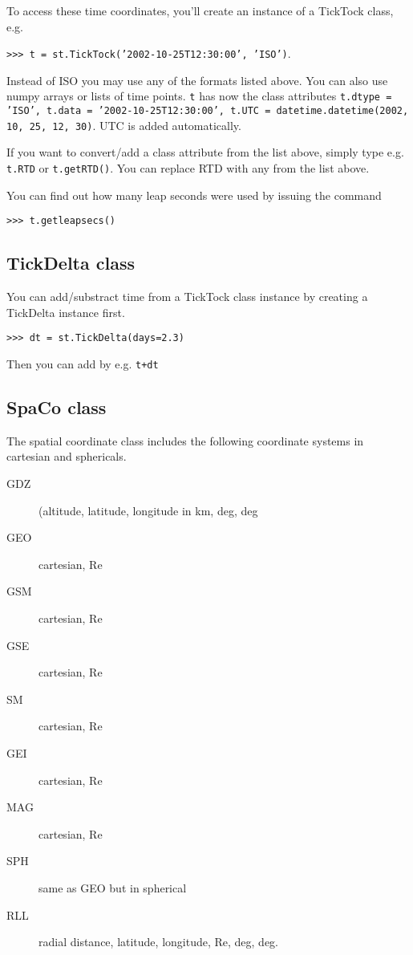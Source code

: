 \documentclass[11pt]{amsart}
\begin{document}
To access these time coordinates, you'll create an instance of a TickTock class, e.g. 

\texttt{>>> t = st.TickTock('2002-10-25T12:30:00', 'ISO')}. 

Instead of ISO you may use any of the formats listed above. You can also use numpy arrays or lists of time points. \texttt{t} has now the class attributes \texttt{t.dtype = 'ISO', t.data = '2002-10-25T12:30:00', t.UTC = datetime.datetime(2002, 10, 25, 12, 30)}. UTC is added automatically.

If you want to convert/add a class attribute from the list above, simply type e.g.
\texttt{t.RTD} or \texttt{t.getRTD()}. You can replace RTD with any from the list above.

You can find out how many leap seconds were used by issuing the command

\texttt{>>> t.getleapsecs()}


\subsection{TickDelta class}

You can add/substract time from a TickTock class instance by creating a TickDelta instance first. 

\texttt{>>> dt = st.TickDelta(days=2.3)}

Then you can add by e.g. \texttt{t+dt} 

\subsection{SpaCo class}

The spatial coordinate class includes the following coordinate systems in cartesian and sphericals. 

\begin{description}
\item[GDZ] (altitude, latitude, longitude in km, deg, deg
\item[GEO] cartesian, Re
\item[GSM] cartesian, Re
\item[GSE] cartesian, Re
\item[SM] cartesian, Re
\item[GEI] cartesian, Re
\item[MAG] cartesian, Re
\item[SPH] same as GEO but in spherical
\item[RLL] radial distance, latitude, longitude, Re, deg, deg.
\end{description}
\end{document}
